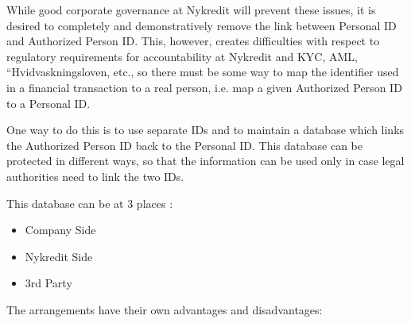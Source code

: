 While good corporate governance at Nykredit will prevent these issues, it is desired to completely and demonstratively remove the link between Personal ID and Authorized Person ID. This, however, creates difficulties with respect to regulatory requirements for accountability at Nykredit and KYC, AML, “Hvidvaskningsloven, etc., so there must be some way to map the identifier used in a financial transaction to a real person, i.e. map a given Authorized Person ID to a Personal ID.

One way to do this is to use separate IDs and to maintain a database which links the Authorized Person ID back to the Personal ID. This database can be protected in different ways, so that the information can be used only in case legal authorities need to link the two IDs.

This database can be at 3 places :
\begin{itemize}
\item Company Side
\item Nykredit Side
\item 3rd Party
\end{itemize}
The arrangements have their own advantages and disadvantages:

